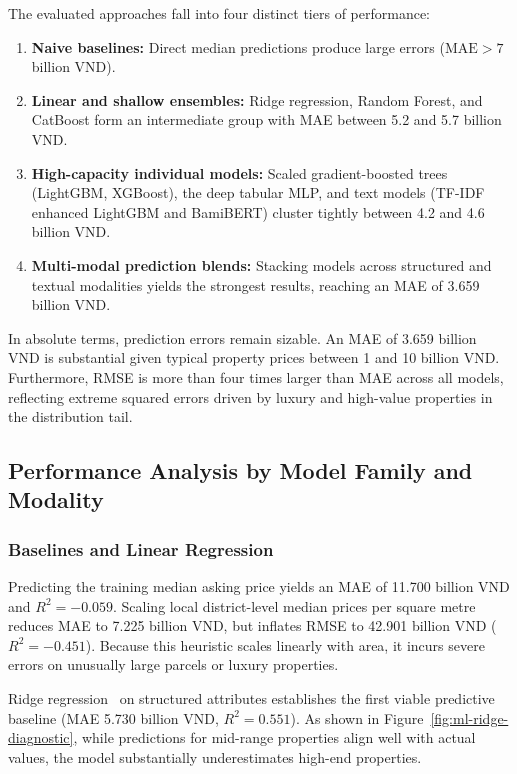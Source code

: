 The evaluated approaches fall into four distinct tiers of performance:
\begin{enumerate}
  \item \textbf{Naive baselines:} Direct median predictions produce large errors ($\text{MAE} > 7$ billion VND).
  \item \textbf{Linear and shallow ensembles:} Ridge regression, Random Forest, and CatBoost form an intermediate group with MAE between 5.2 and 5.7 billion VND.
  \item \textbf{High-capacity individual models:} Scaled gradient-boosted trees (LightGBM, XGBoost), the deep tabular MLP, and text models (TF-IDF enhanced LightGBM and BamiBERT) cluster tightly between 4.2 and 4.6 billion VND.
  \item \textbf{Multi-modal prediction blends:} Stacking models across structured and textual modalities yields the strongest results, reaching an MAE of 3.659 billion VND.
\end{enumerate}

In absolute terms, prediction errors remain sizable. An MAE of 3.659 billion VND is substantial given typical property prices between 1 and 10 billion VND. Furthermore, RMSE is more than four times larger than MAE across all models, reflecting extreme squared errors driven by luxury and high-value properties in the distribution tail.

\subsection{Performance Analysis by Model Family and Modality}
\label{subsec:detailed-analysis}

\subsubsection{Baselines and Linear Regression}

Predicting the training median asking price yields an MAE of 11.700 billion VND and $R^2=-0.059$. Scaling local district-level median prices per square metre reduces MAE to 7.225 billion VND, but inflates RMSE to 42.901 billion VND ($R^2=-0.451$). Because this heuristic scales linearly with area, it incurs severe errors on unusually large parcels or luxury properties.

Ridge regression~\cite{hoerl1970ridge} on structured attributes establishes the first viable predictive baseline (MAE 5.730 billion VND, $R^2=0.551$). As shown in Figure~\ref{fig:ml-ridge-diagnostic}, while predictions for mid-range properties align well with actual values, the model substantially underestimates high-end properties.

